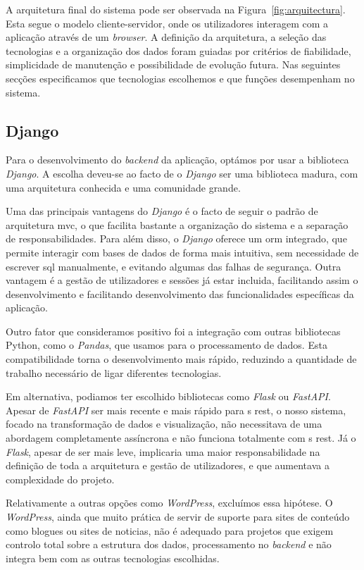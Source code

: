 A arquitetura final do sistema pode ser observada na Figura~\ref{fig:arquitectura}. Esta segue o modelo cliente-servidor, onde os utilizadores interagem com a aplicação através de um \textit{browser}. A definição da arquitetura, a seleção das tecnologias e a organização dos dados foram guiadas por critérios de fiabilidade, simplicidade de manutenção e possibilidade de evolução futura.  Nas seguintes secções especificamos que tecnologias escolhemos e que funções desempenham no sistema.

\subsection{Django}

Para o desenvolvimento do \textit{backend} da aplicação, optámos por usar a biblioteca \textit{Django}. A escolha deveu-se ao facto de o \textit{Django} ser uma biblioteca madura, com uma arquitetura conhecida e uma comunidade grande.

Uma das principais vantagens do \textit{Django} é o facto de seguir o padrão de arquitetura \gls{mvc}, o que facilita bastante a organização do sistema e a separação de responsabilidades. Para além disso, o \textit{Django} oferece um \gls{orm} integrado, que permite interagir com bases de dados de forma mais intuitiva, sem necessidade de escrever \gls{sql} manualmente, e evitando algumas das falhas de segurança. Outra vantagem é a gestão de utilizadores e sessões já estar incluida, facilitando assim o desenvolvimento e facilitando desenvolvimento das funcionalidades específicas da aplicação.

Outro fator que consideramos positivo foi a integração  com outras bibliotecas Python, como o \textit{Pandas}, que usamos para o processamento de dados. Esta compatibilidade torna o desenvolvimento mais rápido, reduzindo a quantidade de trabalho necessário de ligar diferentes tecnologias.

Em alternativa, podiamos ter escolhido bibliotecas como \textit{Flask} ou \textit{FastAPI}. Apesar de \textit{FastAPI} ser mais recente e mais rápido para s \gls{rest}, o nosso sistema, focado na transformação de dados e visualização, não necessitava de uma abordagem completamente assíncrona e não funciona totalmente com s \gls{rest}. Já o \textit{Flask}, apesar de ser mais leve, implicaria uma maior responsabilidade na definição de toda a arquitetura e gestão de utilizadores, e que aumentava a complexidade do projeto.

Relativamente a outras opções como \textit{WordPress}, excluímos essa hipótese. O \textit{WordPress}, ainda que muito prática de servir de suporte para sites de conteúdo como blogues ou sites de noticias, não é adequado para projetos que exigem controlo total sobre a estrutura dos dados, processamento no \textit{backend} e não integra bem com as outras tecnologias escolhidas.

